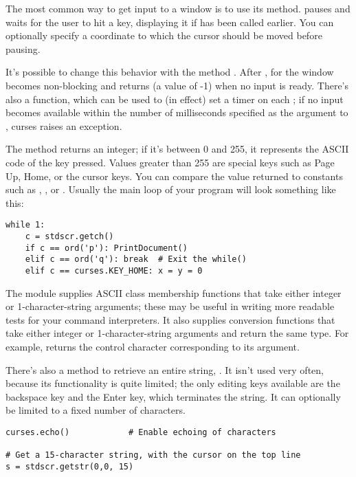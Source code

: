\documentclass{howto}
\begin{document}
The most common way to get input to a window is to use its
 method.   pauses and waits for the
user to hit a key, displaying it if  has been called
earlier.  You can optionally specify a coordinate to which the cursor
should be moved before pausing.

It's possible to change this behavior with the method
. After ,  for
the window becomes non-blocking and returns  (a value
of -1) when no input is ready.  There's also a 
function, which can be used to (in effect) set a timer on each
; if no input becomes available within the number of
milliseconds specified as the argument to ,
curses raises an exception.

The  method returns an integer; if it's between 0 and
255, it represents the ASCII code of the key pressed.  Values greater
than 255 are special keys such as Page Up, Home, or the cursor keys.
You can compare the value returned to constants such as
, , or
.  Usually the main loop of your program
will look something like this:

\begin{verbatim}
while 1:
    c = stdscr.getch()
    if c == ord('p'): PrintDocument()
    elif c == ord('q'): break  # Exit the while()
    elif c == curses.KEY_HOME: x = y = 0
\end{verbatim}

The  module supplies ASCII class membership
functions that take either integer or 1-character-string
arguments; these may be useful in writing more readable tests for
your command interpreters.  It also supplies conversion functions 
that take either integer or 1-character-string arguments and return
the same type.  For example,  returns
the control character corresponding to its argument.

There's also a method to retrieve an entire string,
.  It isn't used very often, because its
functionality is quite limited; the only editing keys available are
the backspace key and the Enter key, which terminates the string.  It
can optionally be limited to a fixed number of characters.

\begin{verbatim}
curses.echo()            # Enable echoing of characters

# Get a 15-character string, with the cursor on the top line 
s = stdscr.getstr(0,0, 15)  
\end{verbatim}
\end{document}
